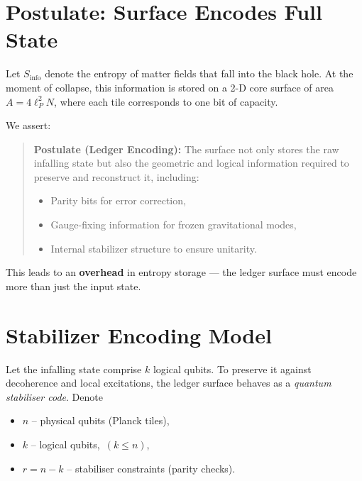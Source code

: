 \documentclass[a4paper, 12pt, oneside]{book}
\numberwithin{equation}{chapter}
\begin{document}
\section{Postulate: Surface Encodes Full State}
\label{sec:CodePostulate}

Let \( S_{\text{info}} \) denote the entropy of matter fields that fall into the black hole.  
At the moment of collapse, this information is stored on a 2-D core surface of area \( A = 4 \ell_P^2 N \),  
where each tile corresponds to one bit of capacity.

We assert:

\begin{quote}
\textbf{Postulate (Ledger Encoding):}  
The surface not only stores the raw infalling state but also the geometric and logical information required  
to preserve and reconstruct it, including:
\begin{itemize}
  \item Parity bits for error correction,
  \item Gauge-fixing information for frozen gravitational modes,
  \item Internal stabilizer structure to ensure unitarity.
\end{itemize}
\end{quote}

This leads to an \textbf{overhead} in entropy storage — the ledger surface must encode more than just the input state.

\section{Stabilizer Encoding Model}
\label{sec:Stabilizer}

Let the infalling state comprise $k$ logical qubits.  To preserve it
against decoherence and local excitations, the ledger surface behaves
as a \emph{quantum stabiliser code}.  Denote
\begin{itemize}
  \item $n$  – physical qubits (Planck tiles),
  \item $k$  – logical qubits, \,$(k\le n)$,
  \item $r=n-k$ – stabiliser constraints (parity checks).
\end{itemize}
\end{document}
